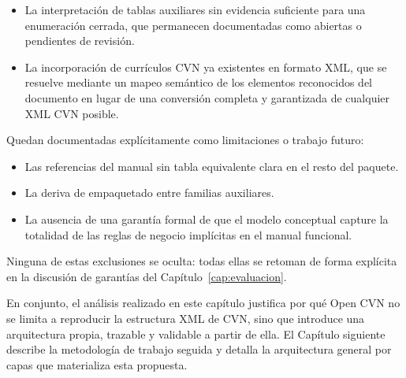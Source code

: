 \begin{itemize}
  \item La interpretación de tablas auxiliares sin evidencia suficiente para
  una enumeración cerrada, que permanecen documentadas como abiertas o
  pendientes de revisión.

  \item La incorporación de currículos CVN ya existentes en formato XML, que
  se resuelve mediante un mapeo semántico de los elementos reconocidos del
  documento en lugar de una conversión completa y garantizada de cualquier
  XML CVN posible.
\end{itemize}

Quedan documentadas explícitamente como limitaciones o trabajo futuro:

\begin{itemize}
  \item Las referencias del manual sin tabla equivalente clara en el resto
  del paquete.

  \item La deriva de empaquetado entre familias auxiliares.

  \item La ausencia de una garantía formal de que el modelo conceptual
  capture la totalidad de las reglas de negocio implícitas en el manual
  funcional.
\end{itemize}

Ninguna de estas exclusiones se oculta: todas ellas se retoman de forma
explícita en la discusión de garantías del
Capítulo~\ref{cap:evaluacion}.

En conjunto, el análisis realizado en este capítulo justifica por qué Open CVN
no se limita a reproducir la estructura XML de CVN, sino que introduce una
arquitectura propia, trazable y validable a partir de ella. El Capítulo
siguiente describe la metodología de trabajo seguida y detalla la arquitectura
general por capas que materializa esta propuesta.
